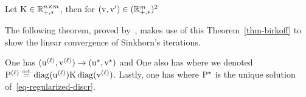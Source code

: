 
\begin{thm}\label{thm-birkoff}
	Let $\K \in \RR_{+,*}^{n \times m}$, then for $(\vD,\vD') \in (\RR_{+,*}^m)^2$
\end{thm}

The following theorem, proved by~\cite{franklin1989scaling}, makes use of this Theorem~\ref{thm-birkoff} to show the linear convergence of Sinkhorn's iterations.

\begin{thm}
	One has $(\it{\uD},\it{\vD}) \rightarrow (\uD^\star,\vD^\star)$ and
	One also has
	where we denoted $\it{\P} \eqdef \diag(\it{\uD}) \K \diag(\it{\vD})$. Lastly, one has
	\eql{\label{eq-convlin-sinkh-prim}
		\|\log(\it{\P}) - \log(\P^\star)\|_\infty \leq \Hilbert(\it{\uD}, \uD^\star) + \Hilbert(\it{\vD}, \vD^\star)
	}
	where $\P^\star$ is the unique solution of~\eqref{eq-regularized-discr}. 
\end{thm}

